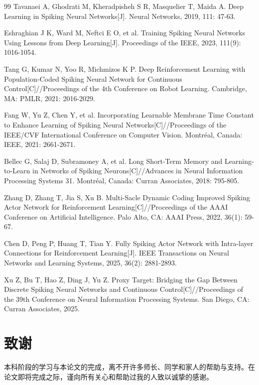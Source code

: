 \documentclass[UTF8,zihao=-4,oneside,openany]{ctexbook}
\begin{document}
\begin{thebibliography}{99}
Tavanaei A, Ghodrati M, Kheradpisheh S R, Masquelier T, Maida A. Deep Learning in Spiking Neural Networks[J]. Neural Networks, 2019, 111: 47-63.

Eshraghian J K, Ward M, Neftci E O, et al. Training Spiking Neural Networks Using Lessons from Deep Learning[J]. Proceedings of the IEEE, 2023, 111(9): 1016-1054.

Tang G, Kumar N, Yoo R, Michmizos K P. Deep Reinforcement Learning with Population-Coded Spiking Neural Network for Continuous Control[C]//Proceedings of the 4th Conference on Robot Learning. Cambridge, MA: PMLR, 2021: 2016-2029.

Fang W, Yu Z, Chen Y, et al. Incorporating Learnable Membrane Time Constant to Enhance Learning of Spiking Neural Networks[C]//Proceedings of the IEEE/CVF International Conference on Computer Vision. Montréal, Canada: IEEE, 2021: 2661-2671.

Bellec G, Salaj D, Subramoney A, et al. Long Short-Term Memory and Learning-to-Learn in Networks of Spiking Neurons[C]//Advances in Neural Information Processing Systems 31. Montréal, Canada: Curran Associates, 2018: 795-805.

Zhang D, Zhang T, Jia S, Xu B. Multi-Sacle Dynamic Coding Improved Spiking Actor Network for Reinforcement Learning[C]//Proceedings of the AAAI Conference on Artificial Intelligence. Palo Alto, CA: AAAI Press, 2022, 36(1): 59-67.

Chen D, Peng P, Huang T, Tian Y. Fully Spiking Actor Network with Intra-layer Connections for Reinforcement Learning[J]. IEEE Transactions on Neural Networks and Learning Systems, 2025, 36(2): 2881-2893.

Xu Z, Bu T, Hao Z, Ding J, Yu Z. Proxy Target: Bridging the Gap Between Discrete Spiking Neural Networks and Continuous Control[C]//Proceedings of the 39th Conference on Neural Information Processing Systems. San Diego, CA: Curran Associates, 2025.
\end{thebibliography}

\chapter*{致谢}

本科阶段的学习与本论文的完成，离不开许多师长、同学和家人的帮助与支持。在论文即将完成之际，谨向所有关心和帮助过我的人致以诚挚的感谢。
\end{document}
